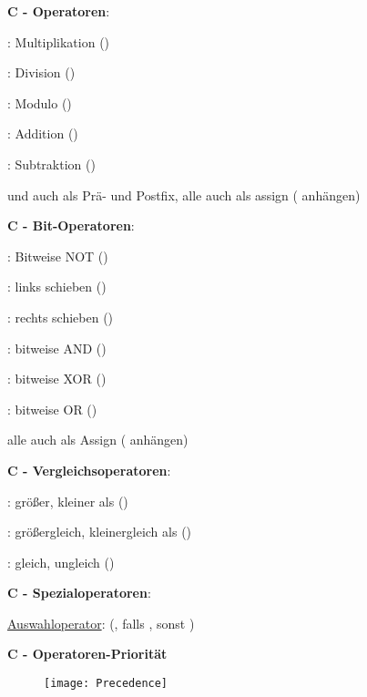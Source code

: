 \textbf{C - Operatoren}:
\begin{items}
  \item \underline{\code{*}}: Multiplikation ()
  \item \underline{\code{/}}: Division ()
  \item \underline{\code{\%}}: Modulo ()
  \item \underline{\code{+}}: Addition ()
  \item \underline{\code{-}}: Subtraktion ()
  \item \code{+} und \code{-} auch als Prä- und Postfix, alle auch als assign (\code{=} anhängen)
\end{items}

\textbf{C - Bit-Operatoren}:
\begin{items}
  \item \underline{\code{\~}}: Bitweise NOT ()
  \item \underline{\code{<<}}: links schieben ()
  \item \underline{\code{>>}}: rechts schieben ()
  \item \underline{\code{&}}: bitweise AND ()
  \item \underline{\code{^}}: bitweise XOR ()
  \item \underline{\code{|}}: bitweise OR ()
  \item alle auch als Assign (\code{=} anhängen)
\end{items}

\textbf{C - Vergleichsoperatoren}:
\begin{items}
  \item \underline{\code{>,<}}: größer, kleiner als ()
  \item \underline{\code{>=,<=}}: größergleich, kleinergleich als ()
  \item \underline{\code{==,!=}}: gleich, ungleich ()
\end{items}

\textbf{C - Spezialoperatoren}:
\begin{items}
  \item \underline{Auswahloperator}:  (, falls , sonst )
\end{items}

\textbf{C - Operatoren-Priorität}
\begin{figure}[ht]
  \centering
  \texttt{[image: Precedence]}
  \label{Precedence}
\end{figure}

